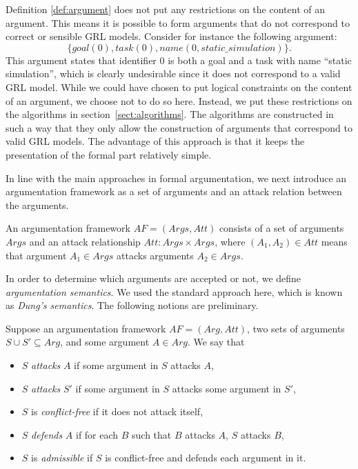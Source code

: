 Definition \ref{def:argument} does not put any restrictions on the content of an argument. This means it is possible to form arguments that do not correspond to correct or sensible GRL models. Consider for instance the following argument: $$\{goal(0), task(0), name(0,static\_simulation)\}.$$ This argument states that identifier 0 is both a goal and a task with name ``static simulation'', which is clearly undesirable since it does not correspond to a valid GRL model. While we could have chosen to put logical constraints on the content of an argument, we choose not to do so here. Instead, we put these restrictions on the algorithms in section~\ref{sect:algorithms}. The algorithms are constructed in such a way that they only allow the construction of arguments that correspond to valid GRL models. The advantage of this approach is that it keeps the presentation of the formal part relatively simple.

In line with the main approaches in formal argumentation, we next introduce an argumentation framework as a set of arguments and an attack relation between the arguments.

\begin{definition} \label{def:argumentationframework}
An argumentation framework $AF=(Args,Att)$ consists of a set of arguments $Args$ and an attack relationship $Att:Args\times Args$, where $(A_1,A_2)\in Att$ means that argument $A_1\in Args$ attacks arguments $A_2\in Args$.
\end{definition}

In order to determine which arguments are accepted or not, we define \emph{argumentation semantics}. We used the standard approach here, which is known as \emph{Dung's semantics}. The following notions are preliminary.

\begin{definition} Suppose an argumentation framework $AF=(Arg,Att)$, two sets of arguments $S\cup S'\subseteq Arg$, and some argument $A\in Arg$. We say that
\begin{itemize}
\item $S$ \emph{attacks} $A$ if some argument in $S$ attacks $A$,
\item $S$ \emph{attacks} $S'$ if some argument in $S$ attacks some argument in $S'$,
\item $S$ is \emph{conflict-free} if it does not attack itself,
\item $S$ \emph{defends} $A$ if for each $B$ such that $B$ attacks $A$, $S$ attacks $B$,
\item $S$ is \emph{admissible} if $S$ is conflict-free and defends each argument in it.
\end{itemize}
\end{definition}


